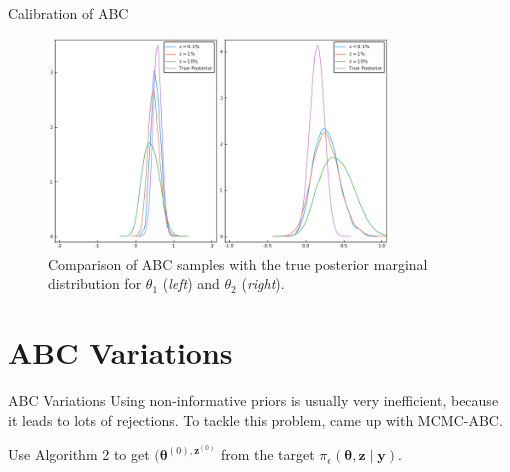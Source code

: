 \documentclass[10pt]{beamer}
\begin{document}
\begin{frame}[fragile]{Calibration of ABC}

    \begin{figure}[H]
        \centering
        \includegraphics[width=9cm]{images/ABCmodel1_Marginal.png}
        \caption{Comparison of ABC samples with the true posterior
        marginal distribution for $\theta_1$ (\textit{left}) and
        $\theta_2$ (\textit{right}).
        }
    \end{figure}

\end{frame}

\AtBeginSection{}
\section[ABC Variations]{ABC Variations}
\begin{frame}[fragile]{ABC Variations}
  Using non-informative priors is usually very inefficient,
  because it leads to lots of rejections. To tackle this
  problem, \citet{Marjoram2013} came up with MCMC-ABC.


\footnotesize
\begin{algorithm}[H]
\SetAlgoLined
Use Algorithm 2 to get $(\bm \theta^{(0), \bm z^{(0)}}$ from the
target $\pi_\epsilon(\bm \theta, \bm z \mid \bm y)$.

\For{i=1 to N}{
 \Repeat{$\rho[\eta(\bm y) , \eta (\bm z)] \leq \epsilon$}{
    Sample $\bm\theta'$ from the Markov kernel
    $q(\cdot \mid \theta^{(i-1)})$

    Generate $\bm z \sim p(\cdot \mid \bm\theta')$

    Sample $u \sim U[0,1]$

    \If{
      $u \leq \frac{
                    \pi(\bm\theta')q(\bm\theta^{(i-1)}\mid)}
          {\pi(\bm\theta^{(i-1)})q(\bm\theta^{(i-1)}\mid)}$ and
      $\rho\{ \eta(\bm z'),\eta(\bm y) \} \leq \epsilon$
    }
    {Set $(\bm \theta^{(i)}, \bm z^{(i)}) =
    (\bm \theta', \bm z')$}
    \Else
    {Set $(\bm \theta^{(i)}, \bm z^{(i)}) =
    (\bm \theta^{(i-1)}, \bm z^{(i-1)})$}
}
}
 \caption{MCMC-ABC}
\end{algorithm}
\end{frame}
\end{document}
